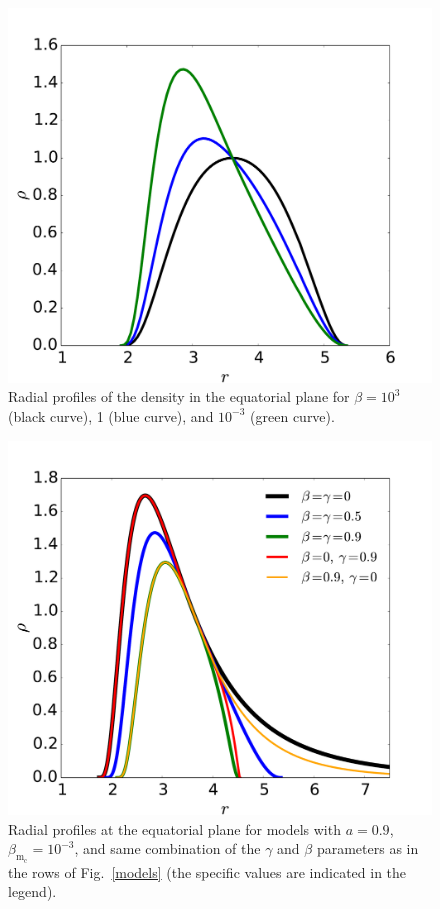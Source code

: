 \documentclass{aa}
\begin{document}
\begin{figure}[t]
\centering
\includegraphics[scale=0.2]{figures/fig4.pdf}
\caption{Radial profiles of the density in the equatorial plane for $\beta=10^3$ (black curve), 1 (blue curve), and $10^{-3}$ (green curve). }
\label{magnetization-profile}
 \end{figure}
 
\begin{figure}[t]
\centering
\includegraphics[scale=0.2]{figures/fig5.pdf}
\caption{Radial profiles at the equatorial plane for models with $a=0.9$, $\beta_{\mathrm{m}_{\mathrm{c}}}
=10^{-3}$, and same combination of the $\gamma$ and $\beta$ parameters as in the rows of Fig.~\ref{models} (the specific values are indicated in the legend).}
\label{more-profile}
\end{figure}
\end{document}
